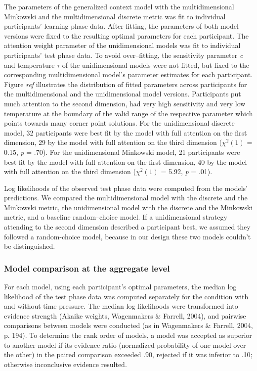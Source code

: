 \documentclass[a4paper,man,natbib]{apa6}
\begin{document}
The parameters of the generalized context model with the multidimensional Minkowski and the multidimensional discrete metric was fit to individual participants’ learning phase data. After fitting, the parameters of both model versions were fixed to the resulting optimal parameters for each participant. The attention weight parameter of the unidimensional models was fit to individual participants’ test phase data. To avoid over--fitting, the sensitivity parameter \textit{c} and temperature $\tau$ of the unidimensional models were not fitted, but fixed to the corresponding multidimensional model’s parameter estimates for each participant. Figure \textit{ref} illustrates the distribution of fitted parameters across participants for the multidimensional and the unidimensional model versions. Participants put much attention to the second dimension, had very high sensitivity and very low temperature at the boundary of the valid range of the respective parameter which points towards many corner point solutions. For the unidimensional discrete model, 32 participants were best fit by the model with full attention on the first dimension, 29 by the model with full attention on the third dimension ($\chi^{2}(1)$ = 0.15, \textit{p} = .70). For the unidimensional Minkowski model, 21 participants were best fit by the model with full attention on the first dimension, 40 by the model with full attention on the third dimension ($\chi^{2}(1)$ = 5.92, \textit{p} = .01).

Log likelihoods of the observed test phase data were computed from the models’ predictions. We compared the multidimensional model with the discrete and the Minkowski metric, the unidimensional model with the discrete and the Minkowski metric, and a baseline random--choice model. If a unidimensional strategy attending to the second dimension described a participant best, we assumed they followed a random-choice model, because in our design these two models couldn't be distinguished. 

\subsubsection{Model comparison at the aggregate level}
For each model, using each participant's optimal parameters, the median log likelihood of the test phase data was computed separately for the condition with and without time pressure. The median log likelihoods were transformed into evidence strength (Akaike weights, Wagenmakers \& Farrell, 2004), and pairwise comparisons between models were conducted (as in Wagenmakers \& Farrell, 2004, p. 194). To determine the rank order of models, a model was accepted as superior to another model if its evidence ratio (normalized probability of one model over the other) in the paired comparison exceeded .90, rejected if it was inferior to .10; otherwise inconclusive evidence resulted. 
\end{document}
